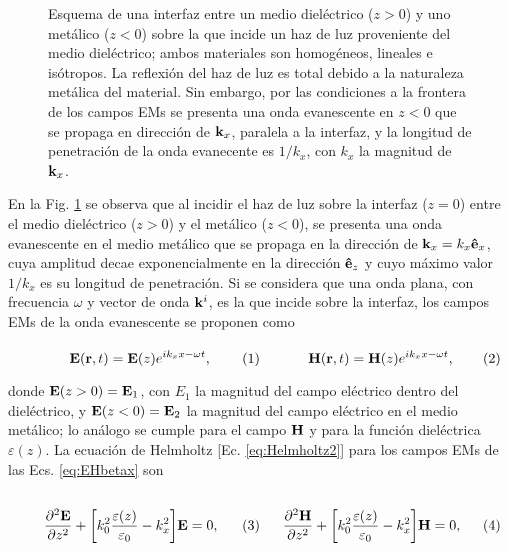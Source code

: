 \begin{figure}[h!]
	\caption{ Esquema de una interfaz entre un medio dieléctrico ($z>0$) y uno metálico ($z<0$) sobre la que incide un haz de luz proveniente del medio dieléctrico; ambos  materiales son homogéneos, lineales e isótropos. La reflexión del haz de luz es total debido a la naturaleza metálica del material. Sin embargo, por las condiciones a la frontera de los campos EMs se presenta una onda evanescente en $z<0$ que se propaga en dirección de $\vb{k}_x$, paralela a la interfaz, y la longitud de penetración de la onda evanecente es $1/k_x$, con $k_x$ la magnitud de $\vb{k}_x$. }\label{fig:SPP}
	\end{figure}
	
En la Fig. \ref{fig:SPP} se observa que al incidir el haz de luz sobre la interfaz ($z=0$)  entre el medio dieléctrico ($z>0$) y el metálico ($z<0$), se presenta una onda evanescente en el medio metálico que se propaga en la dirección de $\vb{k}_x=k_x\vu{e}_x$, cuya amplitud decae exponencialmente en la dirección $\vu{e}_z$ y cuyo máximo valor $1/k_x$ es su longitud de penetración. Si se considera que una onda plana, con frecuencia $\omega$ y vector de onda $\vb{k}^i$, es la que incide sobre la interfaz, los campos EMs de la onda evanescente se proponen como 

	\begin{subequations}\eqhalf{	\vb{E}(\vb{r},t) = \vb{E}(z)e^{ik_x x-\omega t },}
	\eqhalf{\vb{H}(\vb{r},t) = \vb{H}(z)e^{ik_x x-\omega t},}
	\label{eq:EHbetax}\end{subequations} \vspace*{-1em}
	
\noindent donde $\vb{E}(z>0)=\vb{E}_1$, con $E_1$ la magnitud del campo eléctrico dentro del dieléctrico, y $\vb{E}(z<0)=\vb{E}_2$ la magnitud del campo eléctrico en el medio metálico; lo análogo se cumple para el campo $\vb{H}$ y para la función dieléctrica $\varepsilon(z)$. La ecuación de Helmholtz [Ec. \eqref{eq:Helmholtz2}] para los campos EMs de las Ecs. \eqref{eq:EHbetax} son

	\begin{subequations}
	\eqhalf{	\pdv[2]{\vb{E}}{z} + \qty[k_0^2\frac{\varepsilon(z)}{\varepsilon_0} - k_x^2 ] \vb{E}= 0,\label{eq:helmE}}
	\eqhalf{\pdv[2]{\vb{H}}{z} + \qty[k_0^2\frac{\varepsilon(z)}{\varepsilon_0}  - k_x^2 ] \vb{H}= 0, \label{eq:helmH}}
	\end{subequations} 
	
